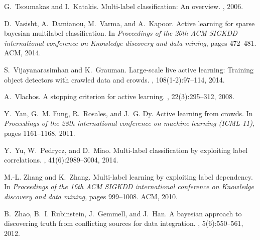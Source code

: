 \documentclass[11pt]{article}
\begin{document}
\begin{thebibliography}{10}
	G.~Tsoumakas and I.~Katakis.
	\newblock Multi-label classification: An overview.
	, 2006.
	
	D.~Vasisht, A.~Damianou, M.~Varma, and A.~Kapoor.
	\newblock Active learning for sparse bayesian multilabel classification.
	\newblock In {\em Proceedings of the 20th ACM SIGKDD international conference
		on Knowledge discovery and data mining}, pages 472--481. ACM, 2014.
	
	S.~Vijayanarasimhan and K.~Grauman.
	\newblock Large-scale live active learning: Training object detectors with
	crawled data and crowds.
	, 108(1-2):97--114,
	2014.
	
	A.~Vlachos.
	\newblock A stopping criterion for active learning.
	, 22(3):295--312, 2008.
	
	Y.~Yan, G.~M. Fung, R.~Rosales, and J.~G. Dy.
	\newblock Active learning from crowds.
	\newblock In {\em Proceedings of the 28th international conference on machine
		learning (ICML-11)}, pages 1161--1168, 2011.
	
	Y.~Yu, W.~Pedrycz, and D.~Miao.
	\newblock Multi-label classification by exploiting label correlations.
	, 41(6):2989--3004, 2014.
	
	M.-L. Zhang and K.~Zhang.
	\newblock Multi-label learning by exploiting label dependency.
	\newblock In {\em Proceedings of the 16th ACM SIGKDD international conference
		on Knowledge discovery and data mining}, pages 999--1008. ACM, 2010.
	
	B.~Zhao, B.~I. Rubinstein, J.~Gemmell, and J.~Han.
	\newblock A bayesian approach to discovering truth from conflicting sources for
	data integration.
	, 5(6):550--561, 2012.
	
\end{thebibliography}
\end{document}
